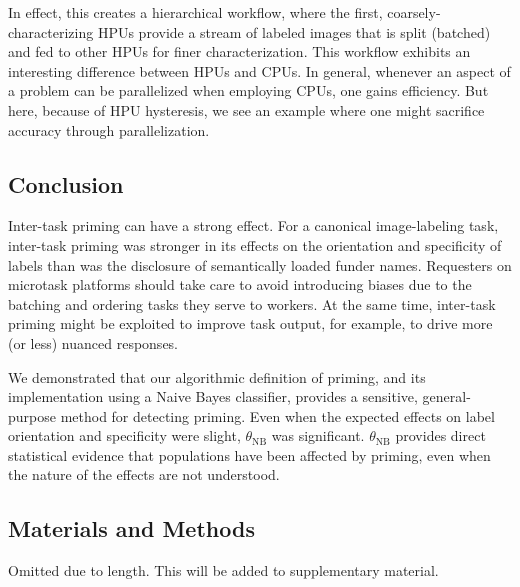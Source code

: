 \documentclass[letterpaper,twocolumn]{article}
\begin{document}
In effect, this creates a hierarchical workflow, where the first, 
coarsely-characterizing HPUs provide a stream of labeled images that is 
split (batched) and fed to other HPUs for finer characterization.  This 
workflow exhibits an interesting difference between HPUs and CPUs.  In general,
whenever an aspect of a problem can be parallelized when employing CPUs, one
gains efficiency.  But here, because of HPU hysteresis, we see an example where
one might sacrifice accuracy through parallelization.

\subsection*{Conclusion}


Inter-task priming can have a strong effect.  
For a canonical image-labeling task, inter-task priming was stronger in its 
effects on the orientation and specificity of labels than was the disclosure of
semantically loaded funder names.  Requesters on microtask platforms should 
take care to avoid introducing biases due to the batching and ordering tasks 
they serve to workers.  At the same time, inter-task priming might be exploited to improve task output, for 
example, to drive more (or less) nuanced responses.

We demonstrated that our algorithmic definition of priming, and its 
implementation using a Naive Bayes classifier, provides a sensitive,
general-purpose method for detecting priming.  Even when the expected effects 
on label orientation and specificity were slight, $\theta_\text{NB}$ 
was significant.  $\theta_\text{NB}$ provides direct statistical evidence that 
populations have been affected by priming, even when the nature of the 
effects are not understood. 

\subsection*{Materials and Methods}
Omitted due to length.  This will be added to supplementary material.

\begingroup
\renewcommand{\chapter}[2]{}

\endgroup
 
\end{document}
